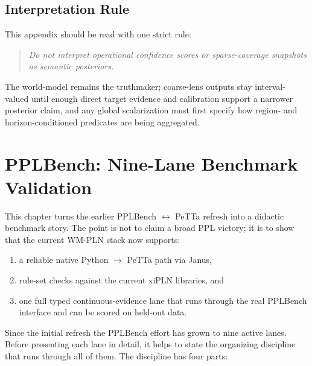 \documentclass[11pt,openany]{report}
\begin{document}
\section{Interpretation Rule}

This appendix should be read with one strict rule:
\begin{quote}
\emph{Do not interpret operational confidence scores or sparse-coverage
snapshots as semantic posteriors.}
\end{quote}
The world-model remains the truthmaker; coarse-lens outputs stay
interval-valued until enough direct target evidence and calibration
support a narrower posterior claim, and any global scalarization must
first specify how region- and horizon-conditioned predicates are being
aggregated.


\chapter{PPLBench: Nine-Lane Benchmark Validation}
\label{app:pplbench-petta-refresh}
\label{ch:pplbench}

This chapter turns the earlier PPLBench $\leftrightarrow$ PeTTa refresh
into a didactic benchmark story.  The point is not to claim a broad
PPL victory; it is to show that the current WM-PLN stack now supports:
\begin{enumerate}
\item a reliable native Python $\to$ PeTTa path via Janus,
\item rule-set checks against the current xiPLN libraries, and
\item one full typed continuous-evidence lane that runs through the real
PPLBench interface and can be scored on held-out data.
\end{enumerate}

\noindent
Since the initial refresh the PPLBench effort has grown to nine active lanes.
Before presenting each lane in detail, it helps to state the organizing
discipline that runs through all of them.  The discipline has four parts:
\end{document}
